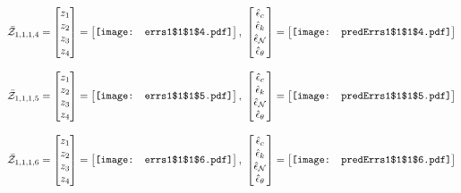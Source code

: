 \documentclass[12pt]{article}
\begin{document}
\begin{gather*}
\bar{\mathcal{Z}}_{1,1,1,4}=\begin{bmatrix}
z_1\\
z_2\\
z_3\\
z_4
 \end{bmatrix}= \begin{bmatrix}
\vcenter{\hbox{\texttt{[image: errs1\$1\$1\$4.pdf]}}}
 \end{bmatrix},\,\, \begin{bmatrix}
\hat{\epsilon}_c\\\hat{\epsilon}_k\\\hat{\epsilon}_\mathcal{N}\\\hat{\epsilon}_\theta
 \end{bmatrix}=\begin{bmatrix}
\vcenter{\hbox{\texttt{[image: predErrs1\$1\$1\$4.pdf]}}}
 \end{bmatrix}
\end{gather*}

\begin{gather*}
\bar{\mathcal{Z}}_{1,1,1,5}=\begin{bmatrix}
z_1\\
z_2\\
z_3\\
z_4
 \end{bmatrix}= \begin{bmatrix}
\vcenter{\hbox{\texttt{[image: errs1\$1\$1\$5.pdf]}}}
 \end{bmatrix},\,\, \begin{bmatrix}
\hat{\epsilon}_c\\\hat{\epsilon}_k\\\hat{\epsilon}_\mathcal{N}\\\hat{\epsilon}_\theta
 \end{bmatrix}=\begin{bmatrix}
\vcenter{\hbox{\texttt{[image: predErrs1\$1\$1\$5.pdf]}}}
 \end{bmatrix}
\end{gather*}


\begin{gather*}
\bar{\mathcal{Z}}_{1,1,1,6}=\begin{bmatrix}
z_1\\
z_2\\
z_3\\
z_4
 \end{bmatrix}= \begin{bmatrix}
\vcenter{\hbox{\texttt{[image: errs1\$1\$1\$6.pdf]}}}
 \end{bmatrix},\,\, \begin{bmatrix}
\hat{\epsilon}_c\\\hat{\epsilon}_k\\\hat{\epsilon}_\mathcal{N}\\\hat{\epsilon}_\theta
 \end{bmatrix}=\begin{bmatrix}
\vcenter{\hbox{\texttt{[image: predErrs1\$1\$1\$6.pdf]}}}
 \end{bmatrix}
\end{gather*}
\end{document}
